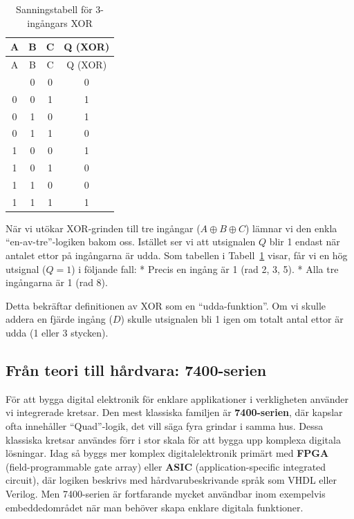 \documentclass[
  swedish,
  letterpaper,
  oneside,
  openany]{book}
\begin{document}
\begin{tcolorbox}[enhanced jigsaw, arc=.35mm, bottomrule=.15mm, bottomtitle=1mm, breakable, colback=white, colbacktitle=quarto-callout-note-color!10!white, colframe=quarto-callout-note-color-frame, coltitle=black, left=2mm, leftrule=.75mm, opacityback=0, opacitybacktitle=0.6, rightrule=.15mm, title=\textcolor{quarto-callout-note-color}{\faInfo}\hspace{0.5em}{Exempel: Analys av 3-ingångars XOR}, titlerule=0mm, toprule=.15mm, toptitle=1mm]

\begin{longtable}[]{@{}cccc@{}}
\caption{Sanningstabell för 3-ingångars
XOR}\label{tbl-xor-3-in}\tabularnewline
\toprule\noalign{}
A & B & C & Q (XOR) \\
\midrule\noalign{}
\endfirsthead
\toprule\noalign{}
A & B & C & Q (XOR) \\
\midrule\noalign{}
\endhead
\bottomrule\noalign{}
\endlastfoot
0 & 0 & 0 & 0 \\
0 & 0 & 1 & 1 \\
0 & 1 & 0 & 1 \\
0 & 1 & 1 & 0 \\
1 & 0 & 0 & 1 \\
1 & 0 & 1 & 0 \\
1 & 1 & 0 & 0 \\
1 & 1 & 1 & 1 \\
\end{longtable}

När vi utökar XOR-grinden till tre ingångar (\(A \oplus B \oplus C\))
lämnar vi den enkla ``en-av-tre''-logiken bakom oss. Istället ser vi att
utsignalen \(Q\) blir 1 endast när antalet ettor på ingångarna är udda.
Som tabellen i Tabell~\ref{tbl-xor-3-in} visar, får vi en hög utsignal
(\(Q=1\)) i följande fall: * Precis en ingång är 1 (rad 2, 3, 5). * Alla
tre ingångarna är 1 (rad 8).

Detta bekräftar definitionen av XOR som en ``udda-funktion''. Om vi
skulle addera en fjärde ingång (\(D\)) skulle utsignalen bli 1 igen om
totalt antal ettor är udda (1 eller 3 stycken).

\end{tcolorbox}

\subsection{Från teori till hårdvara:
7400-serien}\label{fruxe5n-teori-till-huxe5rdvara-7400-serien}

För att bygga digital elektronik för enklare applikationer i
verkligheten använder vi integrerade kretsar. Den mest klassiska
familjen är \textbf{7400-serien}, där kapslar ofta innehåller
``Quad''-logik, det vill säga fyra grindar i samma hus. Dessa klassiska
kretsar användes förr i stor skala för att bygga upp komplexa digitala
lösningar. Idag så byggs mer komplex digitalelektronik primärt med
\textbf{FPGA} (field-programmable gate array) eller \textbf{ASIC}
(application-specific integrated circuit), där logiken beskrivs med
hårdvarubeskrivande språk som VHDL eller Verilog. Men 7400-serien är
fortfarande mycket användbar inom exempelvis embeddedområdet när man
behöver skapa enklare digitala funktioner.
\end{document}
